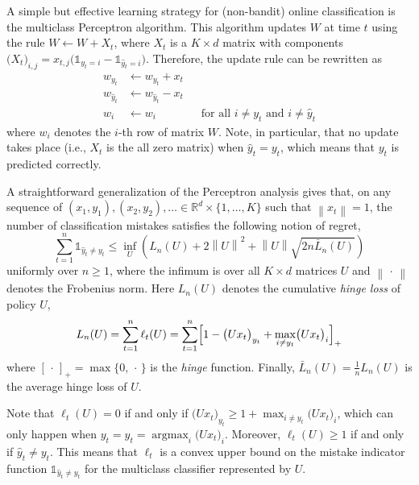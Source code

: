 \documentclass[11pt]{hackednow}
\newcommand{\R}{\mathbb{R}}
\def\ds1{\mathds{1}}
\newcommand{\wh}{\widehat}
\newcommand{\argmax}{\mathop{\mathrm{argmax}}}
\newcommand{\norm}[1]{\left\|{#1}\right\|}
\newcommand{\yhat}{\wh{y}}
\begin{document}
A simple but effective learning strategy for (non-bandit) online classification is the multiclass Perceptron algorithm. This algorithm updates $W$ at time $t$ using the rule $W \leftarrow W + X_t$, where
$X_t$ is a $K \times d$ matrix with components $\bigl(X_t\bigr)_{i,j} = x_{t,j}\bigl(\ds1_{y_t=i} - \ds1_{\yhat_t=i}\bigr)$. Therefore, the update rule can be rewritten as
\begin{align*}
    w_{y_t} &\leftarrow w_{y_t} + x_t
\\
    w_{\yhat_t} &\leftarrow w_{\yhat_t} - x_t
\\
    w_i &\leftarrow w_i \qquad\qquad \text{for all $i \neq y_t$ and $i \neq \yhat_t$}
\end{align*}
where $w_i$ denotes the $i$-th row of matrix $W$.
Note, in particular, that no update takes place (i.e., $X_t$ is the all zero matrix) when $\yhat_t = y_t$, which means that $y_t$ is predicted correctly.

A straightforward generalization of the Perceptron analysis gives that, on any sequence of $(x_1,y_1),(x_2,y_2),\ldots\in\R^d\times\{1,\dots,K\}$ such that $\norm{x_t} =1$, the number of classification mistakes satisfies the following notion of regret,
\[
    \sum_{t=1}^n \ds1_{\yhat_t \neq y_t}
\le
    \inf_{U} \left( L_n(U) + 2\norm{U}^2 + \norm{U}\sqrt{2n\bar{L}_n(U)} \right)
\]
uniformly over $n \ge 1$, where the infimum is over all $K \times d$ matrices $U$ and $\norm{\,\cdot\,}$ denotes the Frobenius norm. Here $L_n(U)$ denotes the cumulative \textsl{hinge loss} of policy $U$,
\[
    L_n(U) = \sum_{t=1}^n \ell_t(U) = \sum_{t=1}^n \Bigl[1 - \bigl(Ux_t\bigr)_{y_t} + \max_{i \neq y_t}\bigl(Ux_t\bigr)_i \Bigr]_+
\]
where $[\,\cdot\,]_+ = \max\{0,\,\cdot\,\}$ is the \textsl{hinge} function. Finally, $\bar{L}_n(U) = \tfrac{1}{n}L_n(U)$ is the average hinge loss of $U$.

Note that $\ell_t(U) = 0$ if and only if $\bigl(Ux_t\bigr)_{y_t} \ge 1 + \max_{i \neq y_t}\bigl(Ux_t\bigr)_i$, which can only happen when $y_t = \yhat_t = \argmax_{i}\bigl(Ux_t\bigr)_i$. Moreover, $\ell_t(U) \ge 1$ if and only if $\yhat_t \neq y_t$. This means that $\ell_t$ is a convex upper bound on the mistake indicator function $\ds1_{\yhat_t \neq y_t}$ for the multiclass classifier represented by $U$.
\end{document}
